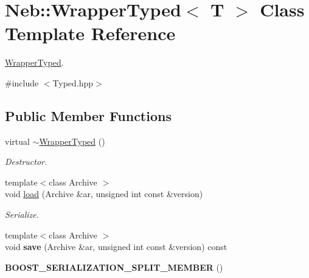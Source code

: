\hypertarget{classNeb_1_1WrapperTyped}{\section{\-Neb\-:\-:\-Wrapper\-Typed$<$ \-T $>$ \-Class \-Template \-Reference}
\label{classNeb_1_1WrapperTyped}
}


\hyperlink{classNeb_1_1WrapperTyped}{\-Wrapper\-Typed}.  




{\ttfamily \#include $<$\-Typed.\-hpp$>$}

\subsection*{\-Public \-Member \-Functions}
\begin{DoxyCompactItemize}
\item 
\hypertarget{classNeb_1_1WrapperTyped_acca2803bb2a5c1ca4b3b5ff51a04b421}{virtual \hyperlink{classNeb_1_1WrapperTyped_acca2803bb2a5c1ca4b3b5ff51a04b421}{$\sim$\-Wrapper\-Typed} ()}\label{classNeb_1_1WrapperTyped_acca2803bb2a5c1ca4b3b5ff51a04b421}

\begin{DoxyCompactList}\small\item\em \-Destructor. \end{DoxyCompactList}\item 
\hypertarget{classNeb_1_1WrapperTyped_a293a6083747b145c8b9db4a9f1410f89}{{\footnotesize template$<$class Archive $>$ }\\void \hyperlink{classNeb_1_1WrapperTyped_a293a6083747b145c8b9db4a9f1410f89}{load} (\-Archive \&ar, unsigned int const \&version)}\label{classNeb_1_1WrapperTyped_a293a6083747b145c8b9db4a9f1410f89}

\begin{DoxyCompactList}\small\item\em \-Serialize. \end{DoxyCompactList}\item 
\hypertarget{classNeb_1_1WrapperTyped_a756a81384782fe7820f383ea989c9ec1}{{\footnotesize template$<$class Archive $>$ }\\void {\bfseries save} (\-Archive \&ar, unsigned int const \&version) const }\label{classNeb_1_1WrapperTyped_a756a81384782fe7820f383ea989c9ec1}

\item 
\hypertarget{classNeb_1_1WrapperTyped_a68f3e137a2c358c596f4358c3a15d1f8}{{\bfseries \-B\-O\-O\-S\-T\-\_\-\-S\-E\-R\-I\-A\-L\-I\-Z\-A\-T\-I\-O\-N\-\_\-\-S\-P\-L\-I\-T\-\_\-\-M\-E\-M\-B\-E\-R} ()}\label{classNeb_1_1WrapperTyped_a68f3e137a2c358c596f4358c3a15d1f8}

\end{DoxyCompactItemize}
